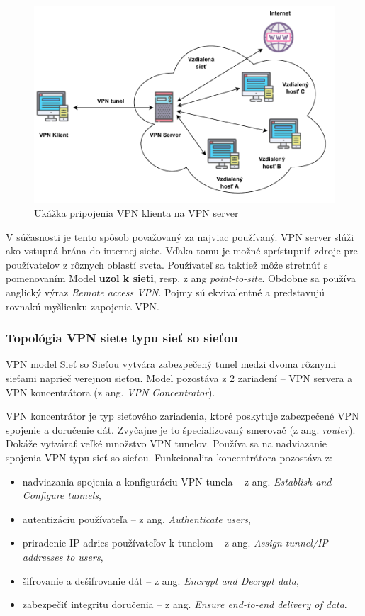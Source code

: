 \begin{figure}[!h]
	\centering
	\includegraphics[width=\textwidth]{figures/c2s}
	\caption{Ukážka pripojenia VPN klienta na VPN server}
	\label{c2s}
\end{figure}
V súčasnosti je tento spôsob považovaný za najviac používaný. VPN server slúži ako vstupná brána do internej siete. Vďaka tomu je možné sprístupniť zdroje pre používateľov z rôznych oblastí sveta. Používateľ sa taktiež môže stretnúť s pomenovaním Model \textbf{uzol k sieti}, resp. z ang \textit{point-to-site}. Obdobne sa používa anglický výraz \textit{Remote access VPN}. Pojmy sú ekvivalentné a predstavujú rovnakú myšlienku zapojenia VPN.  
\subsubsection{Topológia VPN siete typu sieť so sieťou}
VPN model Sieť so Sieťou vytvára zabezpečený tunel medzi dvoma rôznymi sieťami naprieč verejnou sieťou. Model pozostáva z 2 zariadení -- VPN servera a VPN koncentrátora (z ang. \textit{VPN Concentrator}).

VPN koncentrátor je typ sieťového zariadenia, ktoré poskytuje zabezpečené VPN spojenie a doručenie dát. Zvyčajne je to špecializovaný smerovač (z ang. \textit{router}). Dokáže vytvárať veľké množstvo VPN tunelov. Používa sa na nadviazanie spojenia VPN typu sieť so sieťou. Funkcionalita koncentrátora pozostáva z: 
\begin{itemize}
	\item{nadviazania spojenia a konfiguráciu VPN tunela} -- z ang. \textit{Establish and Configure tunnels},
	\item{autentizáciu používateľa} -- z ang. \textit{Authenticate users},
	\item{priradenie IP adries používateľov k tunelom} -- z ang. \textit{Assign tunnel/IP addresses to users},
	\item{šifrovanie a dešifrovanie dát} -- z ang. \textit{Encrypt and Decrypt data},
	\item{zabezpečiť integritu doručenia} -- z ang. \textit{Ensure end-to-end delivery of data}.
\end{itemize}

